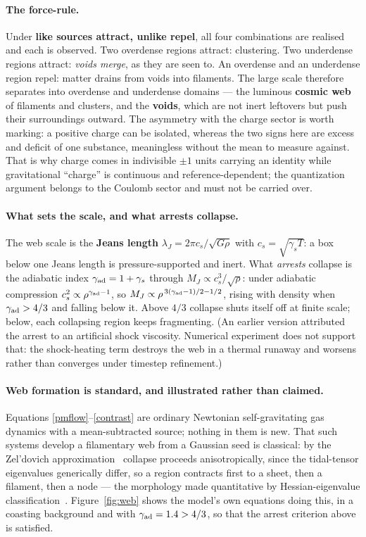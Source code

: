 \documentclass[11pt]{article}
\begin{document}
\paragraph{The force-rule.} Under \textbf{like sources attract, unlike repel}, all four combinations are realised
and each is observed. Two overdense regions attract: clustering. Two underdense regions attract: \emph{voids
merge}, as they are seen to. An overdense and an underdense region repel: matter drains from voids into filaments.
The large scale therefore separates into overdense and underdense domains --- the luminous \textbf{cosmic web} of
filaments and clusters, and the \textbf{voids}, which are not inert leftovers but push their surroundings outward.
The asymmetry with the charge sector is worth marking: a positive charge can be isolated, whereas the two signs
here are excess and deficit of one substance, meaningless without the mean to measure against. That is why charge
comes in indivisible $\pm1$ units carrying an identity while gravitational ``charge'' is continuous and
reference-dependent; the quantization argument belongs to the Coulomb sector and must not be carried over.

\paragraph{What sets the scale, and what arrests collapse.} The web scale is the \textbf{Jeans length}
$\lambda_J=2\pi c_s/\sqrt{G\rho}$ with $c_s=\sqrt{\gamma_s T}$: a box below one Jeans length is pressure-supported
and inert. What \emph{arrests} collapse is the adiabatic index $\gamma_{\rm ad}=1+\gamma_s$ through
$M_J\propto c_s^3/\sqrt\rho$: under adiabatic compression $c_s^2\propto\rho^{\gamma_{\rm ad}-1}$, so
$M_J\propto\rho^{\,3(\gamma_{\rm ad}-1)/2-1/2}$, rising with density when $\gamma_{\rm ad}>4/3$ and falling below
it. Above $4/3$ collapse shuts itself off at finite scale; below, each collapsing region keeps fragmenting. (An
earlier version attributed the arrest to an artificial shock viscosity. Numerical experiment does not support
that: the shock-heating term destroys the web in a thermal runaway and worsens rather than converges under
timestep refinement.)

\paragraph{Web formation is standard, and illustrated rather than claimed.} Equations
\eqref{pmflow}--\eqref{contrast} are ordinary Newtonian self-gravitating gas dynamics with a mean-subtracted
source; nothing in them is new. That such systems develop a filamentary web from a Gaussian seed is classical: by
the Zel'dovich approximation~\cite{zeldovich} collapse proceeds anisotropically, since the tidal-tensor eigenvalues
generically differ, so a region contracts first to a sheet, then a filament, then a node --- the morphology made
quantitative by Hessian-eigenvalue classification~\cite{hahn}. Figure~\ref{fig:web} shows the model's own equations
doing this, in a coasting background and with $\gamma_{\rm ad}=1.4>4/3$, so that the arrest criterion above is
satisfied.
\end{document}
